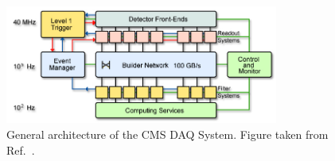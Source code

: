 \begin{figure}[htpb]
  \centering
  \includegraphics[width=0.8\textwidth]{figures/cms/cms_event_builder}
  \caption{ General architecture of the CMS DAQ System. Figure taken from
Ref.~\cite{Bayatian:922757}.
  \label{fig:cms_event_builder}}
\end{figure}


